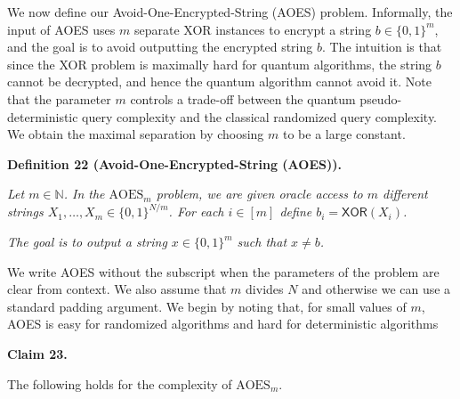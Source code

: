 We now define our Avoid-One-Encrypted-String (AOES) problem.
Informally, the input of AOES uses $m$ separate XOR instances to encrypt a string $b\in\{0,1\}^{m}$, and the goal is to avoid outputting the encrypted string $b$. The intuition is that since the XOR problem is maximally hard for quantum algorithms, the string $b$ cannot be decrypted, and hence the quantum algorithm cannot avoid it.
Note that the parameter $m$ controls a trade-off between the quantum pseudo-deterministic query complexity and the classical randomized query complexity. We obtain the maximal separation by choosing $m$ to be a large constant.\par





\par\medskip\noindent\textbf{
\textbf{Definition 22}\textbf{ }(Avoid-One-Encrypted-String (AOES))\textbf{.}
}\par



\emph{Let $m\in\mathbb{N}$. In the ${\text{AOES}}_{m}$ problem, we are given oracle access to $m$ different strings $X_{1},\ldots,X_{m}\in\{0,1\}^{N/m}$. For each $i\in[m]$ define $b_{i}=\mathsf{XOR}(X_{i})$.}\par




\emph{The goal is to output a string $x\in\{0,1\}^{m}$ such that $x\neq b$.}\par






We write AOES without the subscript when the parameters of the problem are clear from context. We also assume that $m$ divides $N$ and otherwise we can use a standard padding argument. We begin by noting that, for small values of $m$, AOES is easy for randomized algorithms and hard for deterministic algorithms\par





\par\medskip\noindent\textbf{
Claim 23. 
}\par



The following holds for the complexity of ${\text{AOES}}_{m}$.\par


